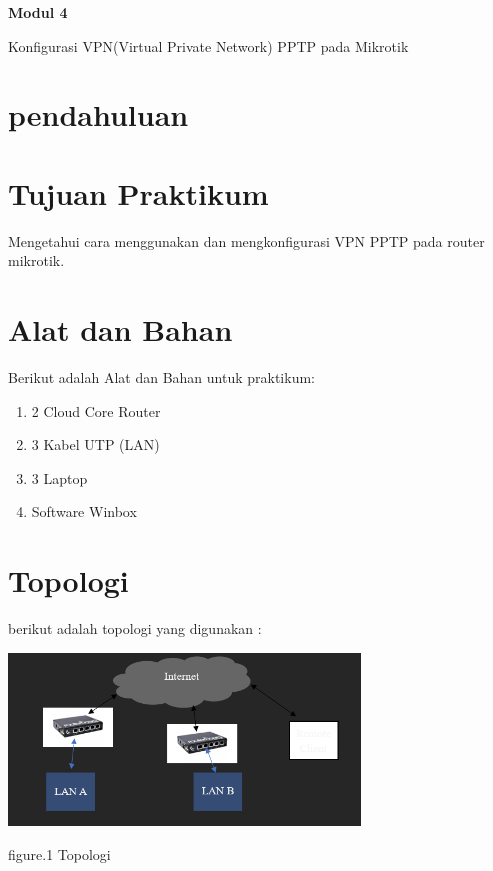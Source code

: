 \newpage
\setcounter{section}{0}
\renewcommand{\thesection}{\arabic{section}}

\begin{center}
    \Huge
    \textbf{Modul 4}
    
    Konfigurasi VPN(Virtual Private Network) PPTP pada Mikrotik

\end{center}


\section{pendahuluan}


\section{Tujuan Praktikum}

Mengetahui cara menggunakan dan mengkonfigurasi VPN PPTP pada router mikrotik.

\section{Alat dan Bahan}

Berikut adalah Alat dan Bahan untuk praktikum:

\begin{enumerate}
    \item 2 Cloud Core Router
    \item 3 Kabel UTP (LAN)
    \item 3 Laptop
    \item Software Winbox
\end{enumerate}

\section{Topologi}

berikut adalah topologi yang digunakan :

\begin{center}
    \includegraphics[width=0.7\textwidth]{image/P4/Topologi.png}    
    
    figure.1 Topologi
\end{center}

